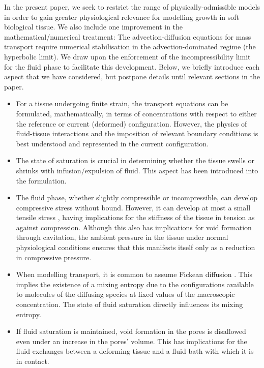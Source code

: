 In the present paper, we seek to restrict the range of
physically-admissible models in order to gain greater
physiological relevance for modelling growth in soft biological
tissue. We also include one improvement in the mathematical/numerical treatment:
The advection-diffusion equations for mass transport
require numerical stabilisation in the advection-dominated regime
(the hyperbolic limit). We draw upon the enforcement of the
incompressibility limit for the fluid phase to facilitate this
development. Below, we briefly introduce each aspect that we have
considered, but postpone details until relevant sections in the paper.

\begin{itemize}
\item[\textbullet] For a tissue undergoing finite strain, the
  transport equations can be formulated, mathematically, in terms of
  concentrations with respect to either the reference or current
  (deformed) configuration. However, the physics of fluid-tissue
  interactions and the imposition of relevant boundary conditions is
  best understood and represented in the current configuration.

\item[\textbullet] The state of saturation is crucial in determining
  whether the tissue swells or shrinks with infusion/expulsion of
  fluid. This aspect has been introduced into the formulation.

\item[\textbullet] The fluid phase, whether slightly compressible or
  incompressible, can develop compressive stress without
  bound. However, it can develop at most a small tensile stress
  \citep{cavitationchris}, having implications for the stiffness of
  the tissue in tension as against compression. Although 
  this also has implications for void formation through cavitation,
  the ambient pressure in the tissue under normal physiological
  conditions ensures that this manifests itself only as a reduction in
  compressive pressure.

\item[\textbullet] When modelling transport, it is common to assume
  Fickean diffusion \citep{KuhlSteinmann:02}. This implies the
  existence of a mixing entropy due to the configurations available to
  molecules of the diffusing species at fixed values of the
  macroscopic concentration. The state of fluid saturation directly
  influences its mixing entropy.

\item[\textbullet] If fluid saturation is maintained, void formation
  in the pores is disallowed even under an increase in the pores'
  volume. This has implications for the fluid exchanges between a
  deforming tissue and a fluid bath with which it is in contact.


\end{itemize}
